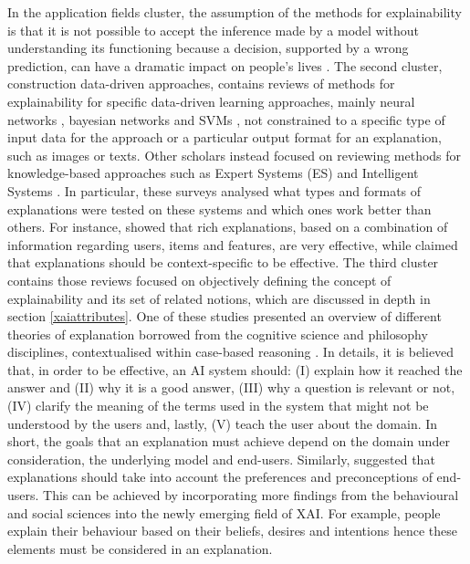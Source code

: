 \documentclass[final,1p,times]{elsarticle}
\begin{document}
In the application fields cluster, the assumption of the methods for explainability is that it is not possible to accept the inference made by a model without understanding its functioning because a decision, supported by a wrong prediction, can have a dramatic impact on people's lives \cite{adadi2018peeking}.
The second cluster, construction data-driven approaches, contains reviews of methods for explainability for specific data-driven learning approaches, mainly neural networks \cite{arras2019evaluating,choo2018visual,dam2018explainable,hoffman2018explaining,mathews2019explainable,montavon2017methods,samek2019towards,zhang2018visual}, bayesian networks \cite{lacave2002review} and SVMs \cite{backhaus2014classification,martens2007comprehensible}, not constrained to a specific type of input data for the approach or a particular output format for an explanation, such as images or texts.
Other scholars instead focused on reviewing methods for knowledge-based approaches such as Expert Systems (ES) \cite{swartout1993explanation} and Intelligent Systems \cite{gregor1999explanations}.
In particular, these surveys analysed what types and formats of explanations were tested on these systems and which ones work better than others. For instance, \cite{papadimitriou2012generalized} showed that rich explanations, based on a combination of information regarding users, items and features, are very effective, while \cite{gregor1999explanations} claimed that explanations should be context-specific to be effective.
The third cluster contains those reviews focused on objectively defining the concept of explainability and its set of related notions, which are discussed in depth in section \ref{xaiattributes}.
One of these studies presented an overview of different theories of explanation borrowed from the cognitive science and philosophy disciplines, contextualised within case-based reasoning \cite{sormo2005explanation}. In details, it is believed that, in order to be effective, an AI system should: (I) explain how it reached the answer and (II) why it is a good answer, (III) why a question is relevant or not, (IV) clarify the meaning of the terms used in the system that might not be understood by the users and, lastly, (V) teach the user about the domain. In short, the goals that an explanation must achieve depend on the domain under consideration, the underlying model and end-users.
Similarly, \cite{miller2017explainable} suggested that explanations should take into account the preferences and preconceptions of end-users. This can be achieved by incorporating more findings from the behavioural and social sciences into the newly emerging field of XAI. For example, people explain their behaviour based on their beliefs, desires and intentions hence these elements must be considered in an explanation. 
\end{document}
